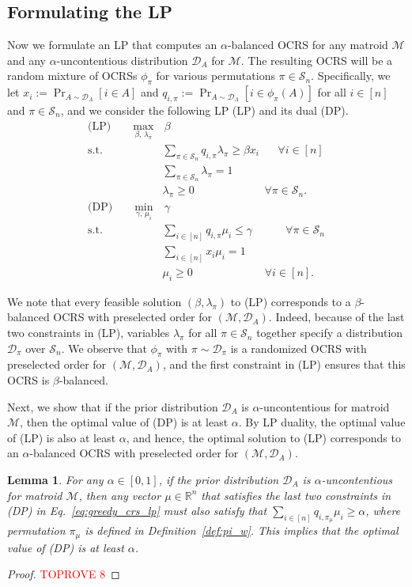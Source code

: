 \documentclass[11pt]{article}
\newcommand{\D}{\mathcal D}
\newcommand{\M}{{\mathcal M}}
\newcommand{\cS}{{\mathcal S}}
\newcommand{\R}{{\mathbb R}}
\newtheorem{lemma}[theorem]{Lemma}
\begin{document}
\subsection{Formulating the LP}
Now we formulate an LP that computes an $\alpha$-balanced OCRS for any matroid $\M$ and any $\alpha$-uncontentious distribution $\D_A$ for $\M$. The resulting OCRS will be a random mixture of OCRSs $\phi_{\pi}$ for various permutations $\pi\in\cS_n$. Specifically, we let $x_i:=\Pr_{A\sim\D_A}[i\in A]$ and $q_{i,\pi}:=\Pr_{A\sim\D_A}[i\in\phi_{\pi}(A)]$ for all $i\in[n]$ and $\pi\in\cS_n$, and we consider the following LP (LP) and its dual (DP).
\begin{align}\label{eq:greedy_crs_lp}
    \textrm{(LP)}\qquad\max_{\beta,\,\lambda_{\pi}}&\,\beta\nonumber\\
    \textrm{s.t. }& \sum_{\pi\in\cS_n} q_{i,\pi}\lambda_{\pi}\ge\beta x_i \quad\,\,\,\,\forall i\in [n]\nonumber\\
    & \sum_{\pi\in\cS_n}\lambda_{\pi}=1\nonumber\\
    & \lambda_{\pi}\ge 0 \qquad\qquad\qquad\,\,\forall\pi\in\cS_n.\nonumber\\
    \textrm{(DP)}\qquad\min_{\gamma,\,\mu_i}&\,\gamma\nonumber\\
    \textrm{s.t. }& \sum_{i\in[n]} q_{i,\pi}\mu_i\le\gamma \qquad\,\,\,\,\,\,\forall\pi\in\cS_n\nonumber\\
    & \sum_{i\in[n]}x_i\mu_i=1\nonumber\\
    & \mu_i\ge 0 \qquad\qquad\qquad\,\,\,\forall i\in [n].
\end{align}

We note that every feasible solution $(\beta,\lambda_{\pi})$ to (LP) corresponds to a $\beta$-balanced OCRS with preselected order for $(\M,\D_A)$. Indeed, because of the last two constraints in (LP), variables $\lambda_{\pi}$ for all $\pi\in \cS_n$ together specify a distribution $\D_{\pi}$ over $\cS_n$. We observe that $\phi_{\pi}$ with $\pi\sim\D_{\pi}$ is a randomized OCRS with preselected order for $(\M,\D_A)$, and the first constraint in (LP) ensures that this OCRS is $\beta$-balanced.

Next, we show that if the prior distribution $\D_A$ is $\alpha$-uncontentious for matroid $\M$, then the optimal value of (DP) is at least $\alpha$. By LP duality, the optimal value of (LP) is also at least $\alpha$, and hence, the optimal solution to (LP) corresponds to an $\alpha$-balanced OCRS with preselected order for $(\M,\D_A)$.
\begin{lemma}\label{lem:greedy_crs_lp}
For any $\alpha\in[0,1]$, if the prior distribution $\D_A$ is $\alpha$-uncontentious for matroid $\M$, then any vector $\mu\in\R^n$ that satisfies the last two constraints in (DP) in Eq.~\eqref{eq:greedy_crs_lp} must also satisfy that $\sum_{i\in[n]} q_{i,\pi_{\mu}}\mu_i\ge\alpha$, where permutation $\pi_{\mu}$ is defined in Definition~\ref{def:pi_w}. This implies that the optimal value of (DP) is at least $\alpha$.
\end{lemma}
\begin{proof}\textcolor{red}{TOPROVE 8}\end{proof}
\end{document}

